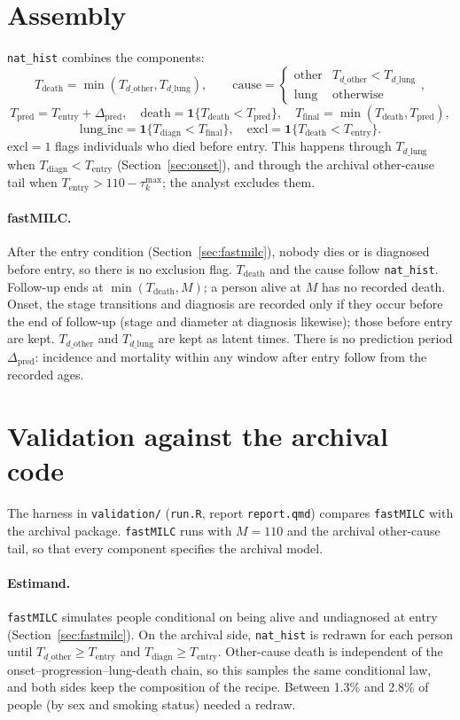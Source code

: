 \documentclass[11pt]{article}
\newcommand{\code}[1]{\texttt{#1}}
\newcommand{\Tentry}{T_{\mathrm{entry}}}
\newcommand{\Tdiagn}{T_{\mathrm{diagn}}}
\newcommand{\Tdo}{T_{d\_\mathrm{other}}}
\newcommand{\Tdl}{T_{d\_\mathrm{lung}}}
\newcommand{\Tdeath}{T_{\mathrm{death}}}
\newcommand{\Tpred}{T_{\mathrm{pred}}}
\newcommand{\Tfinal}{T_{\mathrm{final}}}
\begin{document}
\section{Assembly}\label{sec:assembly}
\code{nat\_hist} combines the components:
\[
\Tdeath = \min(\Tdo, \Tdl),\qquad
\mathrm{cause} = \begin{cases}\text{other} & \Tdo < \Tdl\\ \text{lung} & \text{otherwise}\end{cases},
\]
\[
\Tpred = \Tentry + \Delta_{\mathrm{pred}},\quad
\mathrm{death} = \mathbf 1\{\Tdeath < \Tpred\},\quad
\Tfinal = \min(\Tdeath, \Tpred),
\]
\[
\mathrm{lung\_inc} = \mathbf 1\{\Tdiagn < \Tfinal\},\quad
\mathrm{excl} = \mathbf 1\{\Tdeath < \Tentry\}.
\]
$\mathrm{excl}=1$ flags individuals who died before entry. This happens through
$\Tdl$ when $\Tdiagn < \Tentry$ (Section~\ref{sec:onset}), and through the
archival other-cause tail when $\Tentry > 110-\tau^{\max}_k$; the analyst
excludes them.

\paragraph{fastMILC.} After the entry condition (Section~\ref{sec:fastmilc}),
nobody dies or is diagnosed before entry, so there is no exclusion flag.
$\Tdeath$ and the cause follow \code{nat\_hist}. Follow-up ends at
$\min(\Tdeath, M)$; a person alive at $M$ has no recorded death. Onset, the
stage transitions and diagnosis are recorded only if they occur before the end
of follow-up (stage and diameter at diagnosis likewise); those before entry are
kept. $\Tdo$ and $\Tdl$ are kept as latent times. There is no prediction period
$\Delta_{\mathrm{pred}}$: incidence and mortality within any window after entry
follow from the recorded ages.

\section{Validation against the archival code}\label{sec:validation}

The harness in \code{validation/} (\code{run.R}, report \code{report.qmd})
compares \code{fastMILC} with the archival package. \code{fastMILC} runs with
$M = 110$ and the archival other-cause tail, so that every component specifies
the archival model.

\paragraph{Estimand.} \code{fastMILC} simulates people conditional on being
alive and undiagnosed at entry (Section~\ref{sec:fastmilc}). On the archival
side, \code{nat\_hist} is redrawn for each person until $\Tdo \ge \Tentry$ and
$\Tdiagn \ge \Tentry$. Other-cause death is independent of the
onset--progression--lung-death chain, so this samples the same conditional
law, and both sides keep the composition of the recipe. Between 1.3\% and 2.8\%
of people (by sex and smoking status) needed a redraw.
\end{document}

